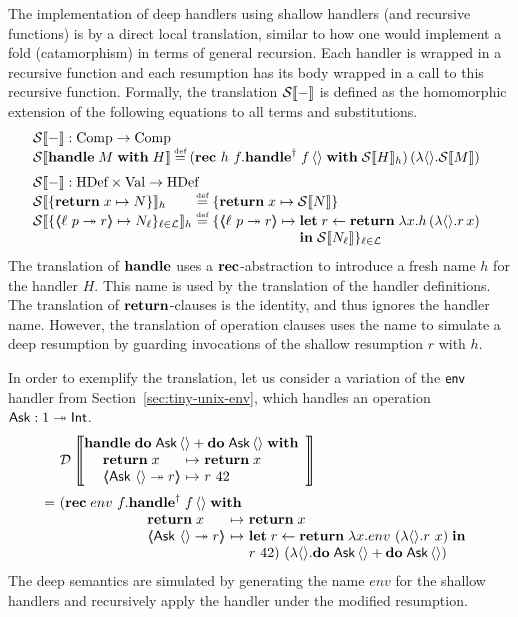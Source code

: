 \documentclass[12pt,phd,lfcs,twoside,openright,logo,leftchapter,normalheadings]{infthesis}
\theoremstyle{plain}
\theoremstyle{definition}
\begin{document}
The implementation of deep handlers using shallow handlers (and
recursive functions) is by a direct local translation, similar to how
one would implement a fold (catamorphism) in terms of general
recursion. Each handler is wrapped in a recursive function and each
resumption has its body wrapped in a call to this recursive function.
%
Formally, the translation $\mathcal{S}\llbracket - \rrbracket$ is defined as the homomorphic
extension of the following equations to all terms and substitutions.
%
\[
\bl
  \dstrans{-} : \CompCat \to \CompCat\\
  \dstrans{\Handle \; M \; \With \; H} \defas
      (\Rec~h~f.\ShallowHandle\; f\,\Unit \; \With \; \dstrans{H}_h)\,(\lambda \Unit{}.\dstrans{M}) \medskip\\
  \dstrans{-} : \HandlerCat \times \ValCat \to \HandlerCat\\
  \ba{@{}l@{~}c@{~}l}
    \dstrans{\{ \Return \; x \mapsto N\}}_h &\defas&
      \{ \Return \; x \mapsto \dstrans{N} \}\\
    \dstrans{\{ \OpCase{\ell}{p}{r} \mapsto N_\ell \}_{\ell \in \mathcal{L}}}_h &\defas&
      \{ \OpCase{\ell}{p}{r} \mapsto
           \bl
             \Let \; r \revto \Return \; \lambda x.h\,(\lambda \Unit{}.r\,x)\\
             \In\;\dstrans{N_\ell} \}_{\ell \in \mathcal{L}}
           \el
  \ea
\el
\]
%
The translation of $\mathbf{handle}$ uses a $\mathbf{rec}$-abstraction to introduce a
fresh name $h$ for the handler $H$. This name is used by the
translation of the handler definitions. The translation of
$\mathbf{return}$-clauses is the identity, and thus ignores the handler
name. However, the translation of operation clauses uses the name to
simulate a deep resumption by guarding invocations of the shallow
resumption $r$ with $h$.

In order to exemplify the translation, let us consider a variation of
the $\mathsf{env}$ handler from Section~\ref{sec:tiny-unix-env}, which
handles an operation $\mathsf{Ask} : 1 \twoheadrightarrow \mathsf{Int}$.
%
\[
  \ba{@{~}l@{~}l}
  &\mathcal{D}\left\llbracket
    \ba[m]{@{}l}
      \Handle\;\Do\;\Ask\,\Unit + \Do\;\Ask\,\Unit\;\With\\
        \quad\ba[m]{@{~}l@{~}c@{~}l}
           \Return\;x &\mapsto& \Return\;x\\
           \OpCase{\Ask}{\Unit}{r} &\mapsto& r~42
         \ea
    \ea
  \right\rrbracket \medskip\\
  =& \bl
    (\Rec\;env~f.
      \bl
         \ShallowHandle\;f\,\Unit\;\With\\
         \quad\ba[t]{@{~}l@{~}c@{~}l}
           \Return\;x &\mapsto& \Return\;x\\
           \OpCase{\Ask}{\Unit}{r} &\mapsto&
             \bl
             \Let\;r \revto \Return\;\lambda x.env~(\lambda\Unit.r~x)\;\In\\
             r~42)~(\lambda\Unit.\Do\;\Ask\,\Unit + \Do\;\Ask\,\Unit)
             \el
         \ea
         \el
     \el
  \ea
\]
%
The deep semantics are simulated by generating the name $env$ for the
shallow handlers and recursively apply the handler under the modified
resumption.
\end{document}
